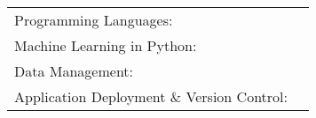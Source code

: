 \documentclass[]{awesome-cv}
\begin{document}
\vspace{-5mm}
\vspace{-3mm}
\begin{cventries}
	\cventry
	{}
	{\def\arraystretch{1.15}{\begin{tabular}{ l l }
		Programming Languages:  & {\skill{ Python, Java, R}} \\
		Machine Learning in Python:  & {\skill{ Pytorch, Pytorch Lightning, NumPy, Sickit-Learn, Tensorflow, Keras, Jax}} \\
		Data Management:  & {\skill{ Pandas, SQL, MS Excel}} \\
		Application Deployment \& Version Control:  & {\skill{ Docker, Google Cloud, Git, Singularity}} \\
		\end{tabular}}}
	{}
	{}
	{}
\end{cventries}
\end{document}
